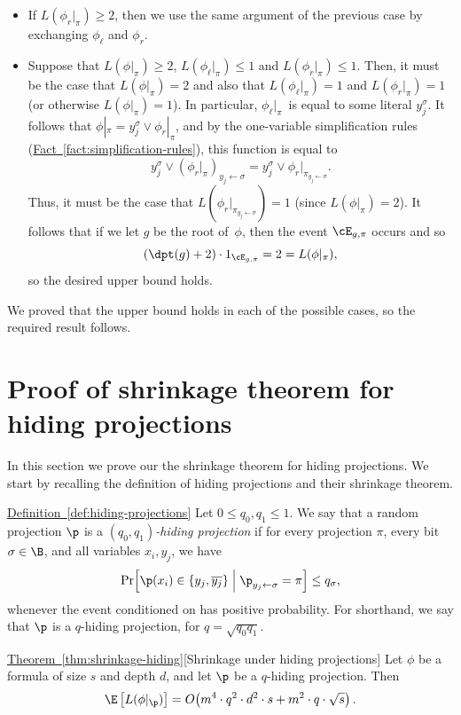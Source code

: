 \documentclass[11pt]{article}
\numberwithin{equation}{section}
\theoremstyle{definition}
\theoremstyle{plain}
\newcommand{\expref}[2]{\hyperref[#2]{#1~\ref{#2}}}
\theoremstyle{definition}\newtheorem{notation}[theorem]{Notation}\theoremstyle{plain}
\begin{document}
\begin{itemize}
as required. 
\item If $L(\phi_{r}|_{\pi})\ge2$, then we use the same argument of the
previous case by exchanging $\phi_{\ell}$ and $\phi_{r}$. 
\item Suppose that $L(\phi|_{\pi})\ge2$, $L(\phi_{\ell}|_{\pi})\le1$ and
$L(\phi_{r}|_{\pi})\le1$. Then, it must be the case that $L(\phi|_{\pi})=2$
and also that $L(\phi_{\ell}|_{\pi})=1$ and $L(\phi_{r}|_{\pi})=1$
(or otherwise $L(\phi|_{\pi})=1$). In particular, $\phi_{\ell}|_{\pi}$~is
equal to some literal $y_{j}^{\sigma}$. It follows that $\phi|_{\pi}=y_{j}^{\sigma}\vee\phi_{r}|_{\pi}$,
and by the one-variable simplification rules 
(\expref{Fact}{fact:simplification-rules}),
this function is equal to 
\[
y_{j}^{\sigma}\vee\left(\phi_{r}|_{\pi}\right)_{y_{j}\gets\sigma}=y_{j}^{\sigma}\vee\phi_{r}|_{\pi_{y_{j}\gets\sigma}}.
\]
Thus, it must be the case that $L(\phi_{r}|_{\pi_{y_{j}\gets\sigma}})=1$
(since $L(\phi|_{\pi})=2$). It follows that if we let $g$ be the
root of~$\phi$, then the event $\cE_{g,\pi}$ occurs and so 
\[
(\dpt(g)+2)\cdot1_{\cE_{g,\pi}}=2=L(\phi|_{\pi}),
\]
so the desired upper bound holds. 
\end{itemize}
We proved that the upper bound holds in each of the possible cases,
so the required result follows.

\section{\label{sec:shrinkage-hiding}Proof of shrinkage theorem for hiding
projections}

In this section we prove our the shrinkage theorem for hiding projections.
We start by recalling the definition of hiding projections and their
shrinkage theorem.
\begin{repdefinition}{\expref{Definition}{def:hiding-projections}}
Let $0\leq q_{0},q_{1}\leq1$. We say that a random projection $\p$
is a \emph{$(q_{0},q_{1})$-hiding projection} if for every projection
$\pi$, every bit $\sigma\in\B$, and all variables $x_{i},y_{j}$,
we have 
\[
\Pr\!\left[\p(x_{i})\in\left\{ y_{j},\overline{y_{j}}\right\} \;\middle|\;\p_{y_{j}\gets\sigma}=\pi\right]\leq q_{\sigma},
\]
whenever the event conditioned on has positive probability. For shorthand,
we say that $\p$ is a $q$-hiding projection, for $q=\sqrt{q_{0}q_{1}}$. 
\end{repdefinition}

\begin{restated}{\expref{Theorem}{thm:shrinkage-hiding}}[Shrinkage under hiding projections]
Let $\phi$ be a formula of size $s$ and depth $d$, and let $\p$
be a $q$-hiding projection. Then 
\[
\E\left[L(\phi|_{\p})\right]=O\!\left(m^{4}\cdot q^{2}\cdot d^{2}\cdot s+m^{2}\cdot q\cdot\sqrt{s}\right).
\]
\end{restated}
\end{document}
